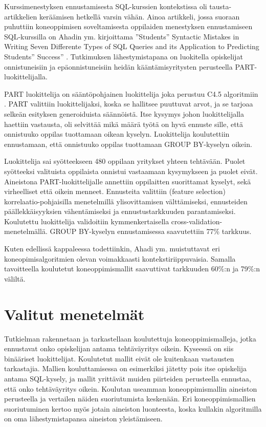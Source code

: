 \documentclass[finnish,twoside,openright]{HYgraduMLDS}
\begin{document}
Kurssimenestyksen ennustamisesta SQL-kurssien kontekstissa oli tausta-artikkelien keräämisen hetkellä varsin vähän. Ainoa artikkeli, jossa suoraan puhuttiin koneoppimisen soveltamisesta oppilaiden menestyksen ennustamiseen SQL-kurssilla on Ahadin ym. kirjoittama ''Students'' Syntactic Mistakes in Writing Seven Differente Types of SQL Queries and its Application to Predicting Students'' Success'' \cite{Ahadi:2016:SSM:2839509.2844640}. Tutkimuksen lähestymistapana on luokitella opiskelijat onnistuneisiin ja epäonnistuneisiin heidän kääntämisyritysten perusteella PART-luokittelijalla.

PART luokittelija on sääntöpohjainen luokittelija joka perustuu C4.5 algoritmiin \cite{Ahadi:2016:SSM:2839509.2844640}. PART valittiin luokittelijaksi, koska se hallitsee puuttuvat arvot, ja se tarjoaa selkeän esityksen generoiduista säännöistä. Itse kysymys johon luokittelijalla haettiin vastausta, oli selvittää mikä määrä työtä on hyvä ennuste sille, että onnistuuko oppilas tuottamaan oikean kyselyn. Luokittelija koulutettiin ennustamaan, että onnistuuko oppilas tuottamaan GROUP BY-kyselyn oikein.

Luokittelija sai syötteekseen 480 oppilaan yritykset yhteen tehtävään. Puolet syötteeksi valituista oppilaista onnistui vastaamaan kysymykseen ja puolet eivät. Aineistona PART-luokittelijalle annettiin oppilaitten suorittamat kyselyt, sekä virheelliset että oikein menneet. Ennusteita valittiin (feature selection) korrelaatio-pohjaisilla menetelmillä ylisovittamisen välttämiseksi, ennusteiden päällekkäisyyksien vähentämiseksi ja ennustustarkkuuden parantamiseksi. Koulutettu luokittelija validoitiin kymmenkertaisella cross-validation-menetelmällä. GROUP BY-kyselyn ennustamisessa saavutettiin 77\% tarkkuus.

Kuten edellissä kappaleessa todettiinkin, Ahadi ym. \cite{Ahadi:2016:SSM:2839509.2844640} muistuttavat eri koneopimisalgoritmien olevan voimakkaasti kontekstiriippuvaisia. Samalla tavoitteella koulutetut koneoppimismallit saavuttivat tarkkuuden 60\%:n ja 79\%:n väliltä.


\chapter{Valitut menetelmät\label{chapter:soveltaminen}}

Tutkielman rakennetaan ja tarkastellaan koulutettuja koneoppimismalleja, jotka ennustavat onko opiskelijan antama tehtäväyritys oikein. Kyseessä on siis binääriset luokittelijat. Koulutetut mallit eivät ole kuitenkaan vastausten tarkastajia. Mallien kouluttamisessa on esimerkiksi jätetty pois itse opiskelija antama SQL-kysely, ja mallit yrittävät muiden piirteiden perusteella ennustaa, että onko tehtäväyritys oikein. Koulutan useamman koneoppimismallin aineiston perusteella ja vertailen näiden suoriutumista keskenään. Eri koneoppimismallien suoriutuminen kertoo myös jotain aineiston luonteesta, koska kullakin algoritmilla on oma lähestymistapansa aineiston yleistämiseen.
\end{document}
